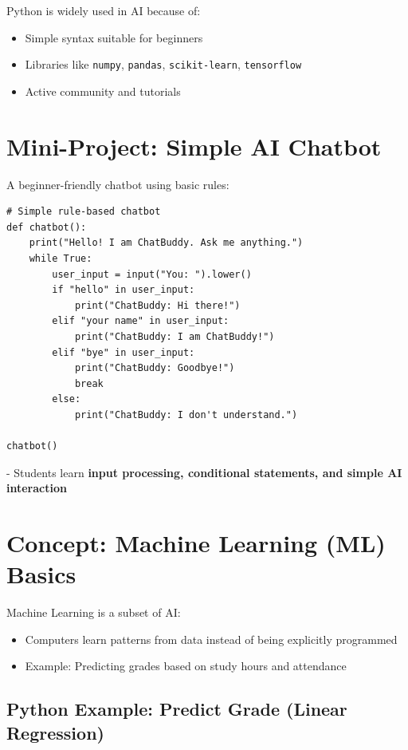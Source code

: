 Python is widely used in AI because of:

\begin{itemize}
    \item Simple syntax suitable for beginners  
    \item Libraries like \texttt{numpy}, \texttt{pandas}, \texttt{scikit-learn}, \texttt{tensorflow}  
    \item Active community and tutorials  
\end{itemize}

\section{Mini-Project: Simple AI Chatbot}

A beginner-friendly chatbot using basic rules:

\begin{verbatim}
# Simple rule-based chatbot
def chatbot():
    print("Hello! I am ChatBuddy. Ask me anything.")
    while True:
        user_input = input("You: ").lower()
        if "hello" in user_input:
            print("ChatBuddy: Hi there!")
        elif "your name" in user_input:
            print("ChatBuddy: I am ChatBuddy!")
        elif "bye" in user_input:
            print("ChatBuddy: Goodbye!")
            break
        else:
            print("ChatBuddy: I don't understand.")

chatbot()
\end{verbatim}

- Students learn \textbf{input processing, conditional statements, and simple AI interaction}  

\section{Concept: Machine Learning (ML) Basics}

Machine Learning is a subset of AI:

\begin{itemize}
    \item Computers learn patterns from data instead of being explicitly programmed  
    \item Example: Predicting grades based on study hours and attendance  
\end{itemize}

\subsection{Python Example: Predict Grade (Linear Regression)}

